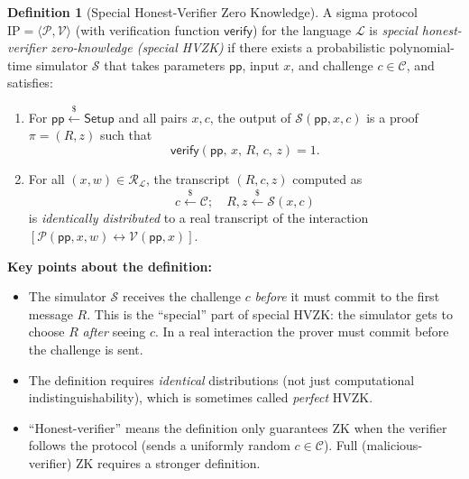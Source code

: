 \documentclass[11pt]{article}
\theoremstyle{plain}
\theoremstyle{definition}
\newtheorem{definition}[theorem]{Definition}
\newcommand{\samplefrom}{\xleftarrow{\$}}
\newcommand{\Sim}{\mathcal{S}}
\newcommand{\Pro}{\mathcal{P}}
\newcommand{\Ver}{\mathcal{V}}
\newcommand{\pp}{\mathsf{pp}}
\newcommand{\verify}{\mathsf{verify}}
\begin{document}
\begin{tcolorbox}[title={Definition: Special HVZK for Sigma Protocols},
                  colback=blue!5, colframe=blue!40!black, breakable]
\begin{definition}[Special Honest-Verifier Zero Knowledge]
\label{def:shvzk}
A sigma protocol $\mathrm{IP} = \langle \Pro, \Ver \rangle$ (with verification
function $\verify$) for the language $\mathcal{L}$ is
\emph{special honest-verifier zero-knowledge (special HVZK)} if there exists a
probabilistic polynomial-time simulator $\Sim$ that takes parameters $\pp$,
input $x$, and challenge $c \in \mathcal{C}$, and satisfies:

\begin{enumerate}
  \item For $\pp \samplefrom \mathsf{Setup}$ and all pairs $x, c$, the output
        of $\Sim(\pp, x, c)$ is a proof $\pi = (R, z)$ such that
        \[
          \verify(\pp,\, x,\, R,\, c,\, z) = 1.
        \]

  \item For all $(x, w) \in \mathcal{R}_{\mathcal{L}}$, the transcript
        $(R, c, z)$ computed as
        \[
          c \samplefrom \mathcal{C};\quad R, z \samplefrom \Sim(x, c)
        \]
        is \emph{identically distributed} to a real transcript of the
        interaction $[\Pro(\pp, x, w) \leftrightarrow \Ver(\pp, x)]$.
\end{enumerate}
\end{definition}
\end{tcolorbox}

\noindent\textbf{Key points about the definition:}
\begin{itemize}
  \item The simulator $\Sim$ receives the challenge $c$ \emph{before} it must
        commit to the first message $R$.  This is the ``special'' part of
        special HVZK: the simulator gets to choose $R$ \emph{after} seeing $c$.
        In a real interaction the prover must commit before the challenge is
        sent.
  \item The definition requires \emph{identical} distributions (not just
        computational indistinguishability), which is sometimes called
        \emph{perfect} HVZK.
  \item ``Honest-verifier'' means the definition only guarantees ZK when the
        verifier follows the protocol (sends a uniformly random $c \in
        \mathcal{C}$).  Full (malicious-verifier) ZK requires a stronger
        definition.
\end{itemize}
\end{document}
